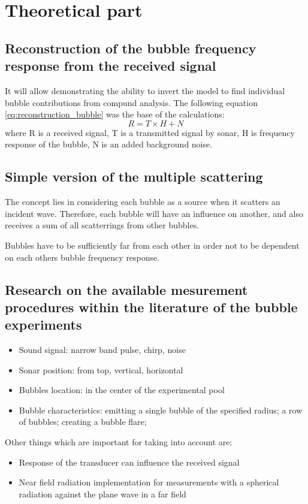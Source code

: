 \documentclass[11pt]{article}
\begin{document}
\section{Theoretical part}

\subsection*{Reconstruction of the bubble frequency response from the received signal}

It will allow demonstrating the ability to invert the model to find individual bubble contributions from compund analysis.
The following equation \ref{eq:reconstruction_bubble} was the base of the calculations:
\begin{equation}\label{eq:reconstruction_bubble}
    R = T \times H + N
\end{equation}
where R is a received signal, T is a transmitted signal by sonar, H is frequency response of the bubble, N is an added background noise.


\subsection*{Simple version of the multiple scattering }

The concept lies in considering each bubble as a source when it scatters an incident wave. 
Therefore, each bubble will have an influence on another, and also receives a sum of all scatterrings from 
other bubbles. 

Bubbles have to be sufficiently far from each other in order not to be dependent on each others bubble frequency response.

\subsection*{Research on the available mesurement procedures within the literature of the bubble experiments}

\begin{itemize}
    \item  Sound signal: narrow band pulse, chirp, noise
    \item Sonar position: from top, vertical, horizontal
    \item Bubbles location: in the center of the experimental pool
   \item Bubble characteristics: emitting a single bubble of the specified radius; a row of bubbles; 
   creating a bubble flare;
\end{itemize}
Other things which are important for taking into account are:
\begin{itemize}
    \item Response of the transducer can influence the received signal
    \item Near field radiation implementation for measurements with a spherical radiation against the plane wave in a far field
\end{itemize}
\end{document}
